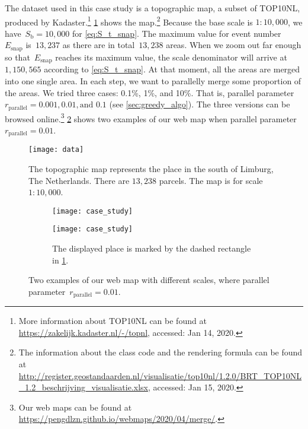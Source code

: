 \documentclass[ijgi,article,submit,moreauthors,pdftex]{Definitions/mdpi}
\begin{document}
The dataset used in this case study is a topographic map, 
a subset of TOP10NL,
produced by Kadaster.\footnote{%
More information about TOP10NL can be found at
\url{https://zakelijk.kadaster.nl/-/topnl},
accessed: Jan 14, 2020.}
%
\figs\ref{fig:data} shows the map.\footnote{%
The information about the class code and the rendering formula can be found at
\url{http://register.geostandaarden.nl/visualisatie/top10nl/1.2.0/BRT_TOP10NL_1.2_beschrijving_visualisatie.xlsx},
accessed: Jan 15, 2020.}
%
Because the base scale is $1:10{,}000$, 
we have~$S_\mathrm{b} = 10{,}000$ for \eq\ref{eq:S_t_snap}.
The maximum value for event number~$E_\mathrm{snap}$ is~$13{,}237$
as there are in total~$13{,}238$ areas.
When we zoom out far enough 
so that~$E_\mathrm{snap}$ reaches its maximum value,
the scale denominator will arrive at~$1{,}150{,}565$
according to \eq\ref{eq:S_t_snap}.
At that moment, all the areas are merged into one single area.
In each step, we want to parallelly merge some proportion of the areas.
We tried three cases: 0.1\%, 1\%, and 10\%.
That is, parallel parameter~$r_\mathrm{parallel}=0.001, 0.01, \text{and~} 0.1$ 
(see \sect\ref{sec:greedy_algo}).
The three versions can be browsed online.\footnote{%
Our web maps can be found at
\url{https://pengdlzn.github.io/webmaps/2020/04/merge/}.}
\fig\ref{fig:web_map} shows two examples of our web map when 
parallel parameter~$r_\mathrm{parallel}=0.01$.


\begin{figure}[tb]
\centering
\texttt{[image: data]}
\caption{
    The topographic map represents the place 
    in the south of Limburg, The Netherlands.
    There are $13{,}238$ parcels.
    The map is for scale $1:10{,}000$.}
\label{fig:data}
\end{figure}


\begin{figure}[tb]
\centering
\begin{subfigure}[t]{\textwidth}
\centering
\texttt{[image: case\_study]}
\caption{}
\end{subfigure}
\newline
\vspace{0.3cm}
%
\begin{subfigure}[t]{\textwidth}
\centering
\texttt{[image: case\_study]}
\caption{The displayed place is marked 
    by the dashed rectangle in \fig\ref{fig:data}.}
\end{subfigure}
\caption{Two examples of our web map with different scales,
    where parallel parameter~$r_\mathrm{parallel}= 0.01$.
    }
\label{fig:web_map}
\end{figure}
\end{document}
